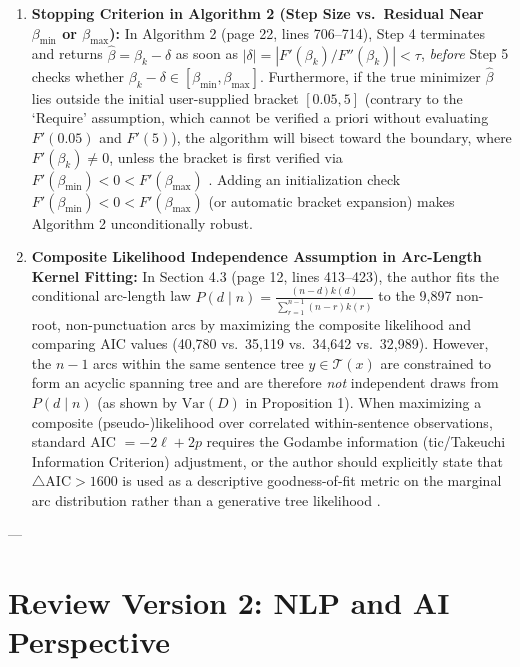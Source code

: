 \documentclass[11pt,a4paper]{article}
\begin{document}
\begin{enumerate}[label=\textbf{Issue \arabic*:}, wide, labelwidth=!, labelindent=0pt]
    \item \textbf{Stopping Criterion in Algorithm 2 (Step Size vs.\ Residual Near $\beta_{\min}$ or $\beta_{\max}$):}
    In Algorithm 2 (page 22, lines 706--714), Step 4 terminates and returns $\hat{\beta} = \beta_k - \delta$ as soon as $|\delta| = |F'(\beta_k)/F''(\beta_k)| < \tau$, \emph{before} Step 5 checks whether $\beta_k - \delta \in [\beta_{\min}, \beta_{\max}]$. Furthermore, if the true minimizer $\hat{\beta}$ lies outside the initial user-supplied bracket $[0.05, 5]$ (contrary to the `Require' assumption, which cannot be verified a priori without evaluating $F'(0.05)$ and $F'(5)$), the algorithm will bisect toward the boundary, where $F'(\beta_k) \ne 0$, unless the bracket is first verified via $F'(\beta_{\min}) < 0 < F'(\beta_{\max})$ \cite{Nocedal2006}. Adding an initialization check $F'(\beta_{\min}) < 0 < F'(\beta_{\max})$ (or automatic bracket expansion) makes Algorithm 2 unconditionally robust.

    \item \textbf{Composite Likelihood Independence Assumption in Arc-Length Kernel Fitting:}
    In Section 4.3 (page 12, lines 413--423), the author fits the conditional arc-length law $P(d \mid n) = \frac{(n-d)k(d)}{\sum_{r=1}^{n-1}(n-r)k(r)}$ to the 9,897 non-root, non-punctuation arcs by maximizing the composite likelihood and comparing AIC values (40,780 vs.\ 35,119 vs.\ 34,642 vs.\ 32,989). However, the $n-1$ arcs within the same sentence tree $y \in \mathcal{T}(x)$ are constrained to form an acyclic spanning tree and are therefore \emph{not} independent draws from $P(d \mid n)$ (as shown by $\mathrm{Var}(D)$ in Proposition 1). When maximizing a composite (pseudo-)likelihood over correlated within-sentence observations, standard AIC $= -2\ell + 2p$ requires the Godambe information (tic/Takeuchi Information Criterion) adjustment, or the author should explicitly state that $\triangle\mathrm{AIC} > 1600$ is used as a descriptive goodness-of-fit metric on the marginal arc distribution rather than a generative tree likelihood \cite{Varin2011}.
\end{enumerate}

---

\section{Review Version 2: NLP and AI Perspective}
\end{document}
